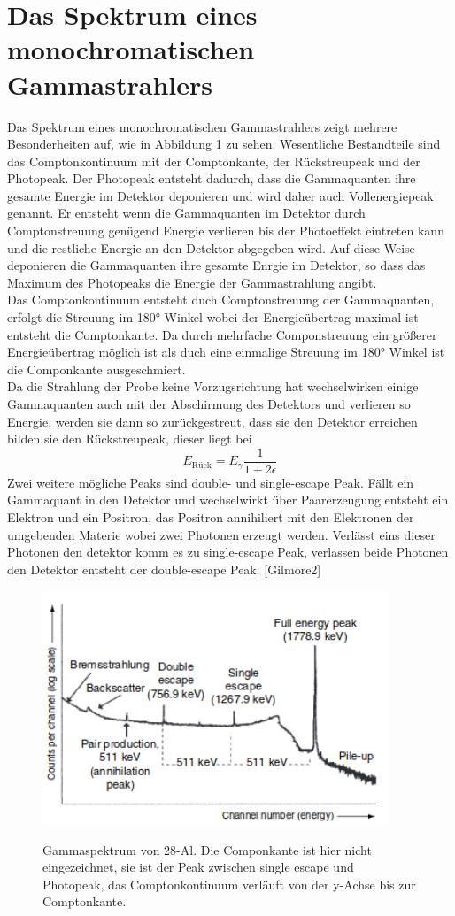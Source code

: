 \section{Das Spektrum eines monochromatischen Gammastrahlers}
Das Spektrum eines monochromatischen Gammastrahlers zeigt mehrere Besonderheiten auf, wie in Abbildung \ref{fig:Spektrum} zu
sehen. Wesentliche Bestandteile sind das Comptonkontinuum mit der Comptonkante, der Rückstreupeak
und der Photopeak. Der Photopeak entsteht dadurch, dass die Gammaquanten ihre gesamte Energie im Detektor deponieren
und wird daher auch Vollenergiepeak genannt. Er entsteht wenn die Gammaquanten im Detektor durch
Comptonstreuung genügend Energie verlieren bis der Photoeffekt eintreten kann und die restliche Energie
an den Detektor abgegeben wird. Auf diese Weise deponieren die Gammaquanten ihre gesamte Enrgie im
Detektor, so dass das Maximum des Photopeaks die Energie der Gammastrahlung angibt.\\
Das Comptonkontinuum entsteht duch Comptonstreuung der Gammaquanten, erfolgt die Streuung im
180° Winkel wobei der Energieübertrag maximal ist entsteht die Comptonkante. Da durch mehrfache
Componstreuung ein größerer Energieübertrag möglich ist als duch eine einmalige Streuung im 180° Winkel ist die
Componkante ausgeschmiert.\\
Da die Strahlung der Probe keine Vorzugsrichtung hat wechselwirken einige Gammaquanten auch mit der
Abschirmung des Detektors und verlieren so Energie, werden sie dann so zurückgestreut, dass sie den
Detektor erreichen bilden sie den Rückstreupeak, dieser liegt bei
\begin{equation}
  E_{\text{Rück}}=E_{\gamma}\frac{1}{1+2\epsilon}
  \label{eqn:Rückstreu}
\end{equation}
Zwei weitere mögliche Peaks sind double- und single-escape Peak. Fällt ein Gammaquant in den Detektor und wechselwirkt über
Paarerzeugung entsteht ein Elektron und ein Positron, das Positron annihiliert mit den Elektronen der umgebenden Materie wobei
zwei Photonen erzeugt werden. Verlässt eins dieser Photonen den detektor komm es zu single-escape Peak, verlassen beide
Photonen den Detektor entsteht der double-escape Peak. [Gilmore2]


\begin{figure}
  \centering
  \includegraphics[height=7cm]{Spektrum.png}
  \caption{Gammaspektrum von 28-Al. Die Componkante ist hier nicht eingezeichnet, sie ist der Peak zwischen single escape und Photopeak,
  das Comptonkontinuum verläuft von der y-Achse bis zur Comptonkante.}\cite{Gilmore2}
  \label{fig:Spektrum}
\end{figure}
